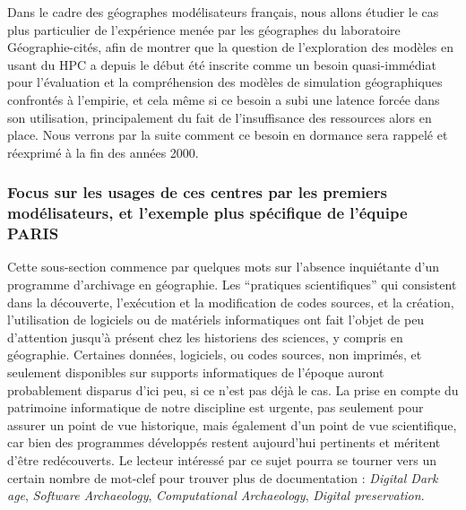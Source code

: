 Dans le cadre des géographes modélisateurs français, nous allons étudier le cas plus particulier de l'expérience menée par les géographes du laboratoire Géographie-cités, afin de montrer que la question de l'exploration des modèles en usant du HPC a depuis le début été inscrite comme un besoin quasi-immédiat pour l'évaluation et la compréhension des modèles de simulation géographiques confrontés à l'empirie, et cela même si ce besoin a subi une latence forcée dans son utilisation, principalement du fait de l'insuffisance des ressources alors en place. Nous verrons par la suite comment ce besoin en dormance sera rappelé et réexprimé à la fin des années 2000.




\subsubsection{Focus sur les usages de ces centres par les premiers modélisateurs, et l'exemple plus spécifique de l'équipe PARIS}
\label{sssec:contexte_modelisateur}

Cette sous-section commence par quelques mots sur l'absence inquiétante d'un programme d'archivage en géographie. Les \enquote{pratiques scientifiques} qui consistent dans la découverte, l’exécution et la modification de codes sources, et la création, l'utilisation de logiciels ou de matériels informatiques ont fait l'objet de peu d'attention jusqu'à présent chez les historiens des sciences, y compris en géographie. Certaines données, logiciels, ou codes sources, non imprimés, et seulement disponibles sur supports informatiques de l'époque auront probablement disparus d'ici peu, si ce n'est pas déjà le cas. La prise en compte du patrimoine informatique de notre discipline est urgente, pas seulement pour assurer un point de vue historique, mais également d'un point de vue scientifique, car bien des programmes développés restent aujourd'hui pertinents et méritent d'être redécouverts. Le lecteur intéressé par ce sujet pourra se tourner vers un certain nombre de mot-clef pour trouver plus de documentation : \textit{Digital Dark age}, \textit{Software Archaeology}, \textit{Computational Archaeology}, \textit{Digital preservation}.


